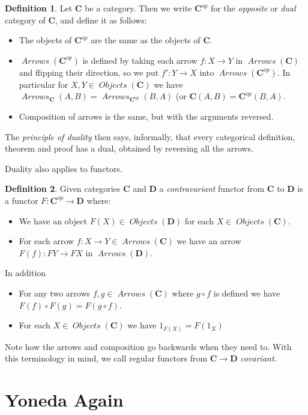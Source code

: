 \documentclass[12pt]{article}
\theoremstyle{definition}
\theoremstyle{definition}
\newtheorem{defn}{Definition}[]
\theoremstyle{definition}
\numberwithin{equation}{section}
\newcommand{\cat}[1]{\mathbf{#1}}      %
\newcommand{\CC}{\cat{C}}
\newcommand{\CCop}{\cat{C}^{\mathrm op}}
\newcommand{\DD}{\cat{D}}
\DeclareMathOperator{\Arrows}{\mathit{Arrows}}
\DeclareMathOperator{\Objects}{\mathit{Objects}}
\def\objc{\Objects(\cat{C})}
\def\ni{\goodbreak\noindent}
\begin{document}
\begin{defn}
Let $\CC$ be a category. Then we write $\CCop$ for the {\it opposite} or {\it dual}
category of $\CC$, and define it as follows:
\begin{itemize}
\item The objects of $\CCop$ are the same as the objects of $\CC$.
\item $\Arrows(\CCop)$ is defined by taking each arrow $f :X \to Y$ in $\Arrows(\CC)$ and
flipping their direction, so we put $f': Y \to X$ into $\Arrows(\CCop)$. In particular for
$X, Y \in \Objects(\CC)$ we have $\Arrows_{\CC}(A, B) = \Arrows_{\CCop}(B, A)$ (or $\CC(A,
B) = \CCop(B, A)$.
\item Composition of arrows is the same, but with the arguments reversed.
\end{itemize}
\end{defn}
\ni
The {\it principle of duality} then says, informally, that every categorical definition,
theorem and proof has a dual, obtained by reversing all the arrows.

Duality also applies to functors.

\begin{defn}
Given categories $\CC$ and $\DD$ a {\it contravariant} functor from $\CC$ to $\DD$ is a
functor $F: \CCop \to \DD$ where:
\begin{itemize}
\item We have an object $F(X) \in \Objects(\DD)$ for each $X \in \objc$.
\item For each arrow $f : X \to Y \in \Arrows(\CC)$ we have an arrow $F(f): FY \to FX$ in $\Arrows(\DD)$.
\end{itemize}
\goodbreak
\ni
In addition
\begin{itemize}
\item For any two arrows $f, g \in \Arrows(\CC)$ where $g \circ f$ is defined we have
$F(f) \circ F(g) = F(g \circ f)$.
\item For each $X \in \Objects(\CC)$ we have $1_{F(X)} = F(1_X)$
\end{itemize}

\end{defn}
\noindent
Note how the arrows and composition go backwards when they need to. With this terminology
in mind, we call regular functors from $\CC \to \DD$ {\it covariant}.

\section{Yoneda Again}
\end{document}
